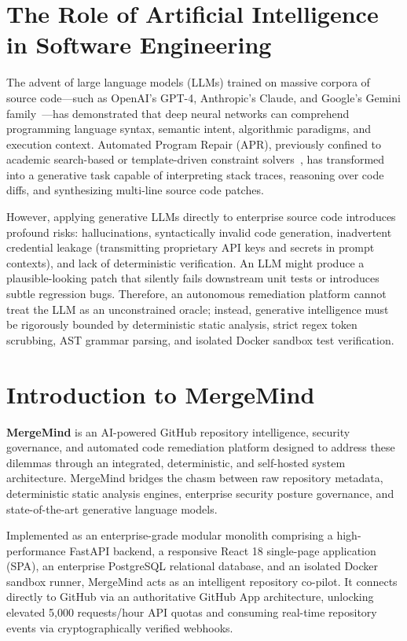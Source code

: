 \section{The Role of Artificial Intelligence in Software Engineering}
\label{sec:ai-in-se}

The advent of large language models (LLMs) trained on massive corpora of source code---such as OpenAI's GPT-4, Anthropic's Claude, and Google's Gemini family~\cite{deepmind2023gemini,chen2021evaluating}---has demonstrated that deep neural networks can comprehend programming language syntax, semantic intent, algorithmic paradigms, and execution context. Automated Program Repair (APR), previously confined to academic search-based or template-driven constraint solvers~\cite{legoues2019automated}, has transformed into a generative task capable of interpreting stack traces, reasoning over code diffs, and synthesizing multi-line source code patches.

However, applying generative LLMs directly to enterprise source code introduces profound risks: hallucinations, syntactically invalid code generation, inadvertent credential leakage (transmitting proprietary API keys and secrets in prompt contexts), and lack of deterministic verification. An LLM might produce a plausible-looking patch that silently fails downstream unit tests or introduces subtle regression bugs. Therefore, an autonomous remediation platform cannot treat the LLM as an unconstrained oracle; instead, generative intelligence must be rigorously bounded by deterministic static analysis, strict regex token scrubbing, AST grammar parsing, and isolated Docker sandbox test verification.

\section{Introduction to MergeMind}
\label{sec:intro-mergemind}

\textbf{MergeMind} is an AI-powered GitHub repository intelligence, security governance, and automated code remediation platform designed to address these dilemmas through an integrated, deterministic, and self-hosted system architecture. MergeMind bridges the chasm between raw repository metadata, deterministic static analysis engines, enterprise security posture governance, and state-of-the-art generative language models.

Implemented as an enterprise-grade modular monolith comprising a high-performance FastAPI backend, a responsive React 18 single-page application (SPA), an enterprise PostgreSQL relational database, and an isolated Docker sandbox runner, MergeMind acts as an intelligent repository co-pilot. It connects directly to GitHub via an authoritative GitHub App architecture, unlocking elevated 5,000 requests/hour API quotas and consuming real-time repository events via cryptographically verified webhooks.

